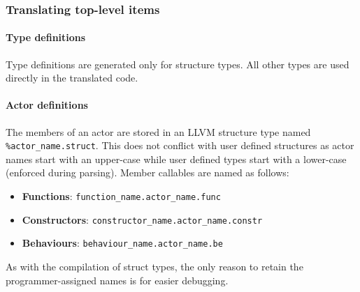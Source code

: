 \documentclass[a4paper,12pt,fleqn]{article}
\begin{document}
\subsubsection{Translating top-level items}
\paragraph{Type definitions\\}

Type definitions are generated only for structure types. All other types are used directly in the translated code.
\paragraph{Actor definitions\\}
The members of an actor are stored in an LLVM structure type named \texttt{\%actor\_name.struct}. This does not conflict with user defined structures as actor names start with an upper-case while user defined types start with a lower-case (enforced during parsing). Member callables are named as follows:
\begin{itemize}
  \item \textbf{Functions}: \texttt{function\_name.actor\_name.func} 
  \item \textbf{Constructors}: \texttt{constructor\_name.actor\_name.constr}
  \item \textbf{Behaviours}: \texttt{behaviour\_name.actor\_name.be}
\end{itemize}
As with the compilation of struct types, the only reason to retain the programmer-assigned names is for easier debugging.
\end{document}
